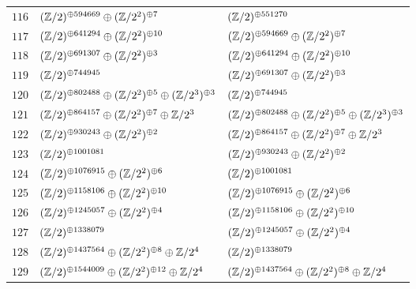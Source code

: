 \begin{supertabular}{|c|p{5.5cm}|p{5.5cm}|}
$116$%
&$(\mathbb{Z}/2)^{\oplus594669}\oplus(\mathbb{Z}/2^{2})^{\oplus7}$%
&$(\mathbb{Z}/2)^{\oplus551270}$\\

$117$%
&$(\mathbb{Z}/2)^{\oplus641294}\oplus(\mathbb{Z}/2^{2})^{\oplus10}$%
&$(\mathbb{Z}/2)^{\oplus594669}\oplus(\mathbb{Z}/2^{2})^{\oplus7}$\\

$118$%
&$(\mathbb{Z}/2)^{\oplus691307}\oplus(\mathbb{Z}/2^{2})^{\oplus3}$%
&$(\mathbb{Z}/2)^{\oplus641294}\oplus(\mathbb{Z}/2^{2})^{\oplus10}$\\

$119$%
&$(\mathbb{Z}/2)^{\oplus744945}$%
&$(\mathbb{Z}/2)^{\oplus691307}\oplus(\mathbb{Z}/2^{2})^{\oplus3}$\\

$120$%
&$(\mathbb{Z}/2)^{\oplus802488}\oplus(\mathbb{Z}/2^{2})^{\oplus5}\oplus(\mathbb{Z}/2^{3})^{\oplus3}$%
&$(\mathbb{Z}/2)^{\oplus744945}$\\

$121$%
&$(\mathbb{Z}/2)^{\oplus864157}\oplus(\mathbb{Z}/2^{2})^{\oplus7}\oplus\mathbb{Z}/2^{3}$%
&$(\mathbb{Z}/2)^{\oplus802488}\oplus(\mathbb{Z}/2^{2})^{\oplus5}\oplus(\mathbb{Z}/2^{3})^{\oplus3}$\\

$122$%
&$(\mathbb{Z}/2)^{\oplus930243}\oplus(\mathbb{Z}/2^{2})^{\oplus2}$%
&$(\mathbb{Z}/2)^{\oplus864157}\oplus(\mathbb{Z}/2^{2})^{\oplus7}\oplus\mathbb{Z}/2^{3}$\\

$123$%
&$(\mathbb{Z}/2)^{\oplus1001081}$%
&$(\mathbb{Z}/2)^{\oplus930243}\oplus(\mathbb{Z}/2^{2})^{\oplus2}$\\

$124$%
&$(\mathbb{Z}/2)^{\oplus1076915}\oplus(\mathbb{Z}/2^{2})^{\oplus6}$%
&$(\mathbb{Z}/2)^{\oplus1001081}$\\

$125$%
&$(\mathbb{Z}/2)^{\oplus1158106}\oplus(\mathbb{Z}/2^{2})^{\oplus10}$%
&$(\mathbb{Z}/2)^{\oplus1076915}\oplus(\mathbb{Z}/2^{2})^{\oplus6}$\\

$126$%
&$(\mathbb{Z}/2)^{\oplus1245057}\oplus(\mathbb{Z}/2^{2})^{\oplus4}$%
&$(\mathbb{Z}/2)^{\oplus1158106}\oplus(\mathbb{Z}/2^{2})^{\oplus10}$\\

$127$%
&$(\mathbb{Z}/2)^{\oplus1338079}$%
&$(\mathbb{Z}/2)^{\oplus1245057}\oplus(\mathbb{Z}/2^{2})^{\oplus4}$\\

$128$%
&$(\mathbb{Z}/2)^{\oplus1437564}\oplus(\mathbb{Z}/2^{2})^{\oplus8}\oplus\mathbb{Z}/2^{4}$%
&$(\mathbb{Z}/2)^{\oplus1338079}$\\

$129$%
&$(\mathbb{Z}/2)^{\oplus1544009}\oplus(\mathbb{Z}/2^{2})^{\oplus12}\oplus\mathbb{Z}/2^{4}$%
&$(\mathbb{Z}/2)^{\oplus1437564}\oplus(\mathbb{Z}/2^{2})^{\oplus8}\oplus\mathbb{Z}/2^{4}$\\


\end{supertabular}
